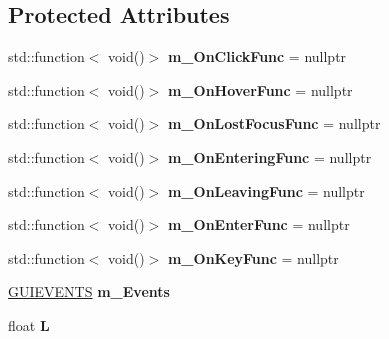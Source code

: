 \subsection*{Protected Attributes}
\begin{DoxyCompactItemize}
\item 
std\+::function$<$ void()$>$ {\bfseries m\+\_\+\+On\+Click\+Func} = nullptr\hypertarget{class_widget_a1874408ab925523014fe8b7018e29e47}{}\label{class_widget_a1874408ab925523014fe8b7018e29e47}

\item 
std\+::function$<$ void()$>$ {\bfseries m\+\_\+\+On\+Hover\+Func} = nullptr\hypertarget{class_widget_a26679d559d8a223414bd2c4488f07d73}{}\label{class_widget_a26679d559d8a223414bd2c4488f07d73}

\item 
std\+::function$<$ void()$>$ {\bfseries m\+\_\+\+On\+Lost\+Focus\+Func} = nullptr\hypertarget{class_widget_aaedad5a9a507e870809e3dfaf445b4b9}{}\label{class_widget_aaedad5a9a507e870809e3dfaf445b4b9}

\item 
std\+::function$<$ void()$>$ {\bfseries m\+\_\+\+On\+Entering\+Func} = nullptr\hypertarget{class_widget_a467d7605bdfbae2bff888144d728a964}{}\label{class_widget_a467d7605bdfbae2bff888144d728a964}

\item 
std\+::function$<$ void()$>$ {\bfseries m\+\_\+\+On\+Leaving\+Func} = nullptr\hypertarget{class_widget_ac63772c05fd9211f0c7e5e9863fd05e4}{}\label{class_widget_ac63772c05fd9211f0c7e5e9863fd05e4}

\item 
std\+::function$<$ void()$>$ {\bfseries m\+\_\+\+On\+Enter\+Func} = nullptr\hypertarget{class_widget_abd69bf67f384765d9e4a71f58169a4ef}{}\label{class_widget_abd69bf67f384765d9e4a71f58169a4ef}

\item 
std\+::function$<$ void()$>$ {\bfseries m\+\_\+\+On\+Key\+Func} = nullptr\hypertarget{class_widget_a0aab66e367305dd5c83a56c1cc5706cd}{}\label{class_widget_a0aab66e367305dd5c83a56c1cc5706cd}

\item 
\hyperlink{struct_g_u_i_e_v_e_n_t_s}{G\+U\+I\+E\+V\+E\+N\+TS} {\bfseries m\+\_\+\+Events}\hypertarget{class_widget_ab09134b0cf6c11b1035dee9b2308d311}{}\label{class_widget_ab09134b0cf6c11b1035dee9b2308d311}

\item 
float {\bfseries L}\hypertarget{class_widget_a71f7cb446bd6f5f6200ccc32f3326bc9}{}\label{class_widget_a71f7cb446bd6f5f6200ccc32f3326bc9}


\end{DoxyCompactItemize}
